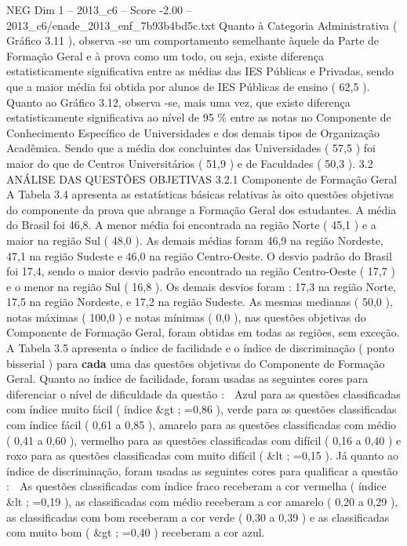 \begin{textsample}{NEG Dim 1 – 2013\_c6 – Score -2.00 – 2013\_c6/enade\_2013\_enf\_7b93b4bd5c.txt}
Quanto à Categoria Administrativa ( Gráfico 3.11 ), observa -se um comportamento semelhante àquele da Parte de Formação Geral e à prova como um todo, ou seja, existe diferença estatisticamente significativa entre as médias das IES Públicas e Privadas, sendo que a maior média foi obtida por alunos de IES Públicas de ensino ( 62,5 ).
Quanto ao Gráfico 3.12, observa -se, mais uma vez, que existe diferença estatisticamente significativa ao nível de 95 \% entre as notas no Componente de Conhecimento Específico de Universidades e dos demais tipos de Organização Acadêmica.
Sendo que a média dos concluintes das Universidades ( 57,5 ) foi maior do que de Centros Universitários ( 51,9 ) e de Faculdades ( 50,3 ). 3.2 ANÁLISE DAS QUESTÕES OBJETIVAS 3.2.1 Componente de Formação Geral A Tabela 3.4 apresenta as estatísticas básicas relativas às oito questões objetivas do componente da prova que abrange a Formação Geral dos estudantes.
A média do Brasil foi 46,8.
A menor média foi encontrada na região Norte ( 45,1 ) e a maior na região Sul ( 48,0 ).
As demais médias foram 46,9 na região Nordeste, 47,1 na região Sudeste e 46,0 na região Centro-Oeste.
O desvio padrão do Brasil foi 17,4, sendo o maior desvio padrão encontrado na região Centro-Oeste ( 17,7 ) e o menor na região Sul ( 16,8 ).
Os demais desvios foram : 17,3 na região Norte, 17,5 na região Nordeste, e 17,2 na região Sudeste.
As mesmas medianas ( 50,0 ), notas máximas ( 100,0 ) e notas mínimas ( 0,0 ), nas questões objetivas do Componente de Formação Geral, foram obtidas em todas as regiões, sem exceção.
A Tabela 3.5 apresenta o índice de facilidade e o índice de discriminação ( ponto bisserial ) para \textbf{cada} uma das questões objetivas do Componente de Formação Geral.
Quanto ao índice de facilidade, foram usadas as seguintes cores para diferenciar o nível de dificuldade da questão :  Azul para as questões classificadas com índice muito fácil ( índice \&gt ; =0,86 ), verde para as questões classificadas com índice fácil ( 0,61 a 0,85 ), amarelo para as questões classificadas com médio ( 0,41 a 0,60 ), vermelho para as questões classificadas com difícil ( 0,16 a 0,40 ) e roxo para as questões classificadas com muito difícil ( \&lt ; =0,15 ).
Já quanto ao índice de discriminação, foram usadas as seguintes cores para qualificar a questão :  As questões classificadas com índice fraco receberam a cor vermelha ( índice \&lt ; =0,19 ), as classificadas com médio receberam a cor amarelo ( 0,20 a 0,29 ), as classificadas com bom receberam a cor verde ( 0,30 a 0,39 ) e as classificadas com muito bom ( \&gt ; =0,40 ) receberam a cor azul.

\end{textsample}

